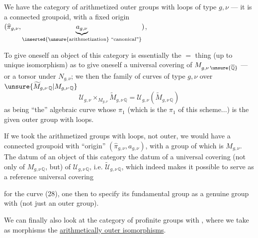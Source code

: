 We have the category of  arithmetized outer groups with loops of type $g,\nu$ --- it is a connected groupoid, with a fixed origin $(\widehat{\pi}_{g,\nu},\underbrace{a_{g,\nu}}_{\inserted{\text{\unsure{arithmetization} ``canonical''}}})$,


To give oneself an object of this category is essentially the $=$ thing (up to unique isomorphism) as to give oneself a universal covering  of $M_{g,\nu\,\unsure{\overline{\mathbb Q}}}$ --- or a torsor under $N_{g,\nu}$; we then  the family of curves of type $g,\nu$ over $\unsure{\widetilde M_{g,\nu\,\mathbb Q}|M_{g,\nu\,\mathbb Q}}$
\[
 \mathcal U_{g,\nu}\times_{M_{g,\nu}}\widetilde M_{g,\nu\,\mathbb Q}
 =\mathcal U_{g,\nu}(\widetilde M_{g,\nu\,\mathbb Q})
\tag{28}
\]
as being ``the'' algebraic curve whose $\pi_1$  (which is  the $\pi_1$ of this scheme...) is the given outer group with loops.

If we took the arithmetized groups with loops, not outer, we would have  a connected groupoid with ``origin'' $(\widehat{\pi}_{g,\nu},a_{g,\nu})$, with a group of  which is $M_{g,\nu}$. The datum of an object of this category   the datum of a universal covering (not only of $M_{g,\nu\,\mathbb Q}$, but) of $\mathcal U_{g,\nu\,\mathbb Q}$, i.e. $\widetilde{\mathcal U}_{g,\nu\,\mathbb Q}$, which indeed makes it possible to serve as a reference universal covering


for the  curve (28),  one then to specify its fundamental group as a genuine group with  (not just an outer group).

We can finally also look at the category of profinite groups with  , where we take as morphisms the \uline{arithmetically outer isomorphisms}.

